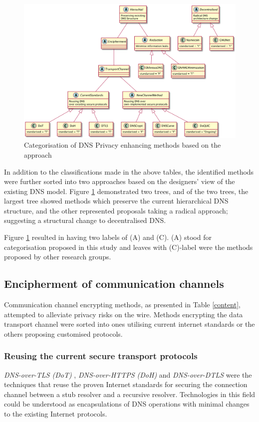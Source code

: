 \begin{figure}[h!]
    \begin{center}
    \includegraphics*[width=1\columnwidth]{img/dnsprivacy-classification}
    \end{center}
    \caption{Categorisation of DNS Privacy enhancing methods based on the approach}
    \label{dns-methods-classification}
\end{figure}

In addition to the classifications made in the above tables, the identified methods were further sorted into two approaches based on the designers' view of the existing DNS model.
Figure \ref{dns-methods-classification} demonstrated two trees, and of the two trees, the largest tree showed methods which preserve the current hierarchical DNS structure, and the other represented proposals taking a radical approach; suggesting a structural change to decentralised DNS.

Figure \ref{dns-methods-classification} resulted in having two labels of (A) and (C). (A) stood for categorisation proposed in this study and leaves with (C)-label were the methods proposed by other research groups.  

\subsection{Encipherment of communication channels}
Communication channel encrypting methods, as presented in Table \ref{content}, attempted to alleviate privacy risks on the wire.
Methods encrypting the data transport channel were sorted into ones utilising current internet standards or the others proposing customised protocols.

\subsubsection{Reusing the current secure transport protocols}
\textit{DNS-over-TLS (DoT)} \cite{rfc7858}, \textit{DNS-over-HTTPS (DoH)} \cite{rfc8484} and \textit{DNS-over-DTLS} \cite{rfc8094} were the techniques that reuse the proven Internet standards for securing the connection channel between a stub resolver and a recursive resolver.
Technologies in this field could be understood as encapsulations of DNS operations with minimal changes to the existing Internet protocols.

